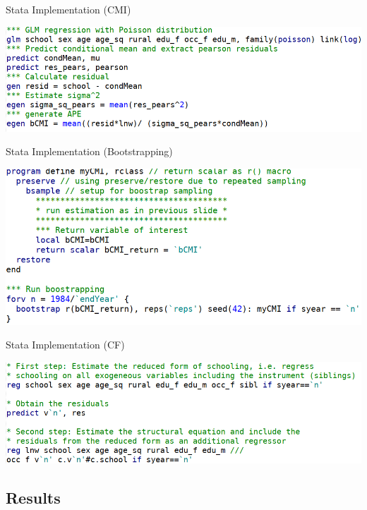 \documentclass[10pt,ignorenonframetext,]{beamer}
\begin{document}
\begin{frame}{Stata Implementation (CMI)}
\protect\hypertarget{stata-implementation-cmi}{}

\includegraphics{./img/code_CMI.png}

\end{frame}

\begin{frame}{Stata Implementation (Bootstrapping)}
\protect\hypertarget{stata-implementation-bootstrapping}{}

\includegraphics{./img/code_bootstrapping.png}

\end{frame}

\begin{frame}{Stata Implementation (CF)}
\protect\hypertarget{stata-implementation-cf}{}

\includegraphics{./img/code_CF.png}

\end{frame}

\hypertarget{results}{%
\subsection{Results}\label{results}}
\end{document}
